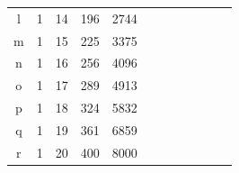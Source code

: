 \documentclass[review,12pt]{elsarticle}
\begin{document}
\begin{table}[htbp!]
\begin{tabular}{cccccccccccc}
\multicolumn{1}{|c|}{l}                  & \multicolumn{1}{c|}{1} & \multicolumn{1}{c|}{14} & \multicolumn{1}{c|}{196} & \multicolumn{1}{c|}{2744}  &                            &                            &                            &                            &                           &                            &                            \\ \cline{1-5}
\multicolumn{1}{|c|}{m}                  & \multicolumn{1}{c|}{1} & \multicolumn{1}{c|}{15} & \multicolumn{1}{c|}{225} & \multicolumn{1}{c|}{3375}  &                            &                            &                            &                            &                           &                            &                            \\ \cline{1-5}
\multicolumn{1}{|c|}{n}                  & \multicolumn{1}{c|}{1} & \multicolumn{1}{c|}{16} & \multicolumn{1}{c|}{256} & \multicolumn{1}{c|}{4096}  &                            &                            &                            &                            &                           &                            &                            \\ \cline{1-5}
\multicolumn{1}{|c|}{o}                  & \multicolumn{1}{c|}{1} & \multicolumn{1}{c|}{17} & \multicolumn{1}{c|}{289} & \multicolumn{1}{c|}{4913}  &                            &                            &                            &                            &                           &                            &                            \\ \cline{1-5}
\multicolumn{1}{|c|}{p}                  & \multicolumn{1}{c|}{1} & \multicolumn{1}{c|}{18} & \multicolumn{1}{c|}{324} & \multicolumn{1}{c|}{5832}  &                            &                            &                            &                            &                           &                            &                            \\ \cline{1-5}
\multicolumn{1}{|c|}{q}                  & \multicolumn{1}{c|}{1} & \multicolumn{1}{c|}{19} & \multicolumn{1}{c|}{361} & \multicolumn{1}{c|}{6859}  &                            &                            &                            &                            &                           &                            &                            \\ \cline{1-5}
\multicolumn{1}{|c|}{r}                  & \multicolumn{1}{c|}{1} & \multicolumn{1}{c|}{20} & \multicolumn{1}{c|}{400} & \multicolumn{1}{c|}{8000}  &                            &                            &                            &                            &                           &                            &                            \\ \cline{1-5}

\end{tabular}
\end{table}
\end{document}
